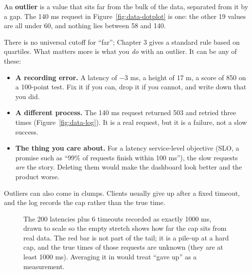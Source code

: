 An \textbf{outlier} is a value that sits far from the bulk of the data, separated from it by a
gap. The 140 ms request in Figure~\ref{fig:data-dotplot} is one: the other 19 values are all
under 60, and nothing lies between 58 and 140.

There is no universal cutoff for ``far''; Chapter 3 gives a standard rule based on quartiles.
What matters more is what you \emph{do} with an outlier. It can be any of these:

\begin{itemize}
  \item \textbf{A recording error.} A latency of $-3$ ms, a height of 17 m, a score of 850 on a
  100-point test. Fix it if you can, drop it if you cannot, and write down that you did.
  \item \textbf{A different process.} The 140 ms request returned 503 and retried three times
  (Figure~\ref{fig:data-log}). It is a real request, but it is a failure, not a slow success.
  \item \textbf{The thing you care about.} For a latency service-level objective (SLO, a promise
  such as ``99\% of requests finish within 100 ms''), the slow
  requests \emph{are} the story. Deleting them would make the dashboard look better and the
  product worse.
\end{itemize}

Outliers can also come in clumps. Clients usually give up after a fixed timeout, and the log
records the cap rather than the true time.

\begin{figure}[H]
\centering
{}
\caption{The 200 latencies plus 6 timeouts recorded as exactly 1000 ms, drawn to scale so the
empty stretch shows how far the cap sits from real data. The red bar is not part of the tail; it
is a pile-up at a hard cap, and the true times of those requests are unknown (they are at least
1000 ms). Averaging it in would treat ``gave up'' as a measurement.}
\label{fig:data-timeouts}
\end{figure}

